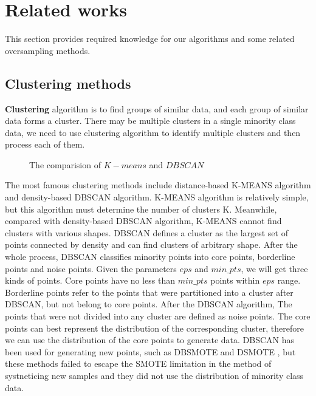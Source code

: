 \documentclass[runningheads]{llncs}
\begin{document}
\section{Related works}
This section provides required knowledge for our algorithms and some related oversampling methods.
\subsection{Clustering methods}
\textbf{Clustering} algorithm is to find groups of similar data, and each group of similar data forms a cluster.
There may be multiple clusters in a single minority class data, 
we need to use clustering algorithm to identify multiple clusters
 and then process each of them.
 \begin{figure}[tb]
  \centering
  \quad
  \caption{The comparision of $K-means$ and $DBSCAN$}
  \label{fig19}
  \end{figure}
The most famous clustering methods include distance-based K-MEANS algorithm and density-based DBSCAN algorithm.
K-MEANS algorithm is relatively simple, but this algorithm must determine the number of clusters K.
Meanwhile, compared with density-based DBSCAN algorithm, K-MEANS cannot find clusters with various shapes.
DBSCAN defines a cluster as the largest set of points
 connected by density and can find clusters of arbitrary shape. After the whole process,
  DBSCAN classifies minority points into core points,
  borderline points and noise points.
 Given the parameters $eps$ and $min\_pts$, we will get three kinds of points. 
 Core points have no less than
  $min\_pts$ points within $eps$ range. 
  Borderline points refer to the points that were partitioned into a cluster after DBSCAN,
  but not belong to core points. After the DBSCAN algorithm, The points that were not divided into any cluster are 
  defined as noise points.
The core points can best represent the distribution of the corresponding cluster, 
therefore we can use the distribution of the core points to generate data.
DBSCAN has been used for generating new points, such as DBSMOTE \cite{2012DBSMOTE} and
DSMOTE \cite{2019Over}, but these methods failed to escape the SMOTE limitation in 
the method of systneticing new samples and they did not use the distribution of minority class data.
\end{document}
